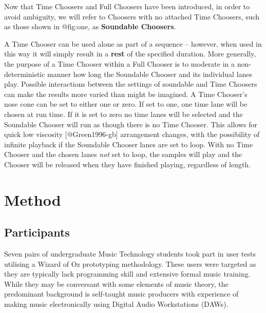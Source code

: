 \documentclass[]{article}
\begin{document}
Now that Time Choosers and Full Choosers have been introduced, in order
to avoid ambiguity, we will refer to Choosers with no attached Time
Choosers, such as those shown in @fig:one, as \textbf{Soundable
Choosers}.

A Time Chooser can be used alone as part of a sequence -- however, when
used in this way it will simply result in a \textbf{rest} of the
specified duration. More generally, the purpose of a Time Chooser within
a Full Chooser is to moderate in a non-deterministic manner how long the
Soundable Chooser and its individual lanes play. Possible interactions
between the settings of soundable and Time Choosers can make the results
more varied than might be imagined. A Time Chooser's nose cone can be
set to either one or zero. If set to one, one time lane will be chosen
at run time. If it is set to zero no time lanes will be selected and the
Soundable Chooser will run as though there is no Time Chooser. This
allows for quick low viscosity {[}@Green1996-gb{]} arrangement changes,
with the possibility of infinite playback if the Soundable Chooser lanes
are set to loop. With no Time Chooser and the chosen lanes \emph{not}
set to loop, the samples will play and the Chooser will be released when
they have finished playing, regardless of length.

\hypertarget{method}{%
\section{Method}\label{method}}

\hypertarget{participants}{%
\subsection{Participants}\label{participants}}

Seven pairs of undergraduate Music Technology students took part in user
tests utilising a Wizard of Oz prototyping methodology. These users were
targeted as they are typically lack programming skill and extensive
formal music training. While they may be conversant with some elements
of music theory, the predominant background is self-taught music
producers with experience of making music electronically using Digital
Audio Workstations (DAWs).
\end{document}
